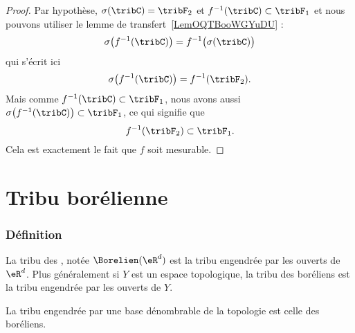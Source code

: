 \begin{proof}
	Par hypothèse, \( \sigma(\tribC)=\tribF_2\) et \( f^{-1}(\tribC)\subset \tribF_1\) et nous pouvons utiliser le lemme de transfert~\ref{LemOQTBooWGYuDU} :
	\begin{equation}
		\sigma\big( f^{-1}(\tribC) \big)=f^{-1}\big( \sigma(\tribC) \big)
	\end{equation}
	qui s'écrit ici
	\begin{equation}
		\sigma\big( f^{-1}(\tribC) \big)=f^{-1}(\tribF_2).
	\end{equation}
	Mais comme \( f^{-1}(\tribC)\subset \tribF_1\), nous avons aussi \( \sigma\big( f^{-1}(\tribC) \big)\subset \tribF_1\), ce qui signifie que
	\begin{equation}
		f^{-1}(\tribF_2)\subset \tribF_1.
	\end{equation}
	Cela est exactement le fait que \( f\) soit mesurable.
\end{proof}


\section{Tribu borélienne}

\subsubsection{Définition}

\begin{definition}        \label{DEFooQBQGooTqGdtY}
	La tribu des , notée \( \Borelien(\eR^d)\) est la tribu engendrée par les ouverts de \( \eR^d\). Plus généralement si \( Y\) est un espace topologique, la tribu des boréliens est la tribu engendrée par les ouverts de \( Y\).
\end{definition}

\begin{proposition} \label{PROPooYEkvbWBz}
	La tribu engendrée par une base dénombrable de la topologie est celle des boréliens.
\end{proposition}

